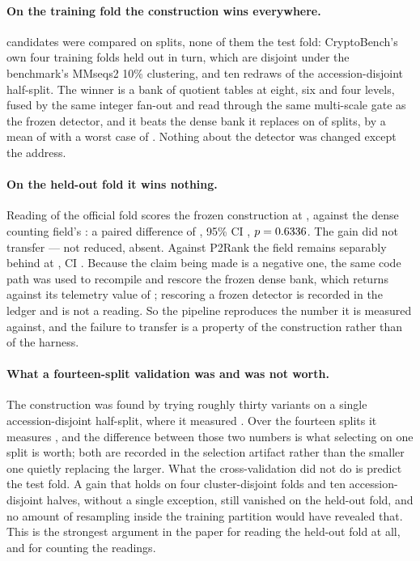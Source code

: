 \documentclass[11pt]{article}
\begin{document}
\paragraph{On the training fold the construction wins everywhere.}
\QuoNCandidates{} candidates were compared on \QuoNSplits{} splits, none of them
the test fold: CryptoBench's own four training folds held out in turn, which are
disjoint under the benchmark's MMseqs2 10\% clustering, and ten redraws of the
accession-disjoint half-split. The winner is a bank of \QuoNTables{} quotient
tables at eight, six and four levels, fused by the same integer fan-out and read
through the same multi-scale gate as the frozen detector, and it beats the dense
bank it replaces on \QuoNBeating{} of \QuoNSplits{} splits, by a mean of
\QuoTrainGain{} with a worst case of \QuoTrainWorst{}. Nothing about the
detector was changed except the address.

\paragraph{On the held-out fold it wins nothing.} Reading
\QuoReadIndex{} of the official fold scores the frozen construction at
\QuoTestAuc{}, against the dense counting field's \AlgAuc{}: a paired difference
of \QuoDAf{}, 95\% CI \QuoDAfCI{}, \(p = 0.6336{}\). The gain did not transfer
--- not reduced, absent. Against P2Rank the field remains separably behind at
\QuoDPTwo{}, CI \QuoDPTwoCI{}. Because the claim being made is a negative one,
the same code path was used to recompile and rescore the frozen dense bank,
which returns \QuoControlRepro{} against its telemetry value of \AlgAuc{};
rescoring a frozen detector is recorded in the ledger and is not a reading. So
the pipeline reproduces the number it is measured against, and the failure to
transfer is a property of the construction rather than of the harness.

\paragraph{What a fourteen-split validation was and was not worth.} The
construction was found by trying roughly thirty variants on a single
accession-disjoint half-split, where it measured \QuoOneSplitGain{}. Over the
fourteen splits it measures \QuoTrainGain{}, and the difference between those
two numbers is what selecting on one split is worth; both are recorded in the
selection artifact rather than the smaller one quietly replacing the larger.
What the cross-validation did not do is predict the test fold. A gain that holds
on four cluster-disjoint folds and ten accession-disjoint halves, without a
single exception, still vanished on the held-out fold, and no amount of
resampling inside the training partition would have revealed that. This is the
strongest argument in the paper for reading the held-out fold at all, and for
counting the readings.
\end{document}
